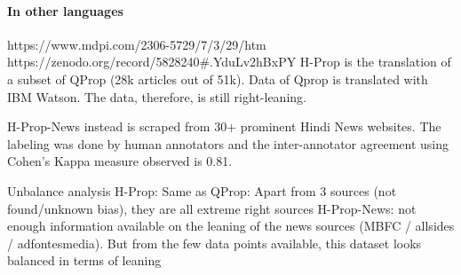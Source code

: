 



\paragraph{In other languages}

https://www.mdpi.com/2306-5729/7/3/29/htm 
https://zenodo.org/record/5828240\#.YduLv2hBxPY 
H-Prop is the translation of a subset of QProp (28k articles out of 51k). Data of Qprop is translated with IBM Watson.
The data, therefore, is still right-leaning.

H-Prop-News instead is scraped from 30+ prominent Hindi News websites. The labeling was done by human annotators and the inter-annotator agreement using Cohen’s Kappa measure observed is 0.81.


Unbalance analysis
H-Prop: Same as QProp: Apart from 3 sources (not found/unknown bias), they are all extreme right sources
H-Prop-News: not enough information available on the leaning of the news sources (MBFC / allsides / adfontesmedia). But from the few data points available, this dataset looks balanced in terms of leaning



